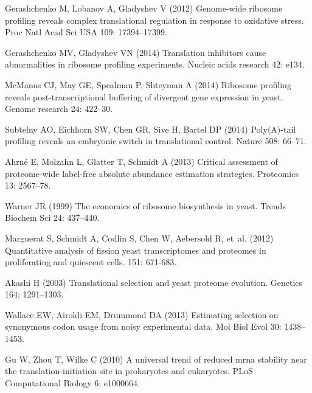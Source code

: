 \documentclass[10pt]{article}
\begin{document}
\begin{thebibliography}{10}
Gerashchenko M, Lobanov A, Gladyshev V (2012) Genome-wide ribosome profiling
  reveals complex translational regulation in response to oxidative stress.
\newblock Proc Natl Acad Sci USA 109: 17394--17399.

Gerashchenko MV, Gladyshev VN (2014) {Translation inhibitors cause
  abnormalities in ribosome profiling experiments.}
\newblock Nucleic acids research 42: e134.

McManus CJ, May GE, Spealman P, Shteyman A (2014) {Ribosome profiling reveals
  post-transcriptional buffering of divergent gene expression in yeast.}
\newblock Genome research 24: 422--30.

Subtelny AO, Eichhorn SW, Chen GR, Sive H, Bartel DP (2014) {Poly(A)-tail
  profiling reveals an embryonic switch in translational control.}
\newblock Nature 508: 66--71.

Ahrn\'{e} E, Molzahn L, Glatter T, Schmidt A (2013) {Critical assessment of
  proteome-wide label-free absolute abundance estimation strategies.}
\newblock Proteomics 13: 2567--78.

Warner JR (1999) {The economics of ribosome biosynthesis in yeast}.
\newblock Trends Biochem Sci 24: 437--440.

Marguerat S, Schmidt A, Codlin S, Chen W, Aebersold R, et~al. ({2012})
  Quantitative analysis of fission yeast transcriptomes and proteomes in
  proliferating and quiescent cells.
 {151}: {671-683}.

Akashi H (2003) {Translational selection and yeast proteome evolution}.
\newblock Genetics 164: 1291--1303.

Wallace EW, Airoldi EM, Drummond DA (2013) {Estimating selection on synonymous
  codon usage from noisy experimental data}.
\newblock Mol Biol Evol 30: 1438--1453.

Gu W, Zhou T, Wilke C (2010) A universal trend of reduced mrna stability near
  the translation-initiation site in prokaryotes and eukaryotes.
\newblock PLoS Computational Biology 6: e1000664.


\end{thebibliography}
\end{document}
